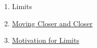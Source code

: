 \clearpage
\renewcommand{\notetitle}{Table of Contents}
\label{toc}
\begin{enumerate}

\item Limits
\item \hyperref[202501070739]{Moving Closer and Closer}
\item \hyperref[202501050700]{Motivation for Limits}
\end{enumerate}

\newpage
